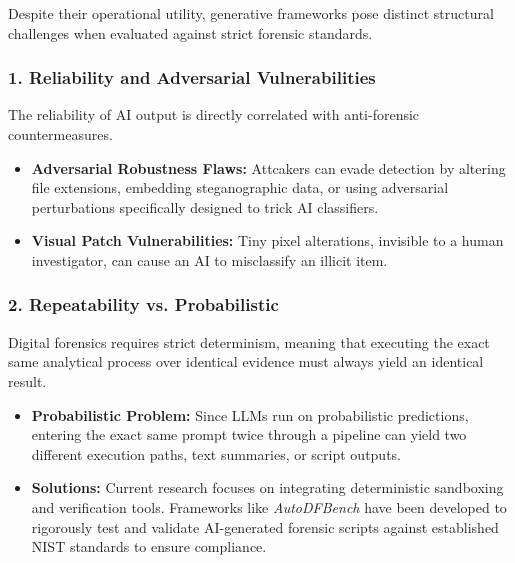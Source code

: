 Despite their operational utility, generative frameworks pose distinct structural challenges when evaluated against strict forensic standards.

\subsubsection*{1. Reliability and Adversarial Vulnerabilities}
The reliability of AI output is directly correlated with anti-forensic countermeasures.
\begin{itemize}
    \item \textbf{Adversarial Robustness Flaws:} Attcakers can evade detection by altering file extensions, embedding steganographic data, or using adversarial perturbations specifically designed to trick AI classifiers.
    \item \textbf{Visual Patch Vulnerabilities:} Tiny pixel alterations, invisible to a human investigator, can cause an AI to misclassify an illicit item.
\end{itemize}

\subsubsection*{2. Repeatability vs. Probabilistic}
Digital forensics requires strict determinism, meaning that executing the exact same analytical process over identical evidence must always yield an identical result.
\begin{itemize}
    \item \textbf{Probabilistic Problem:} Since LLMs run on probabilistic predictions, entering the exact same prompt twice through a pipeline can yield two different execution paths, text summaries, or script outputs.
    \item \textbf{Solutions:} Current research focuses on integrating deterministic sandboxing and verification tools. Frameworks like \textit{AutoDFBench} have been developed to rigorously test and validate AI-generated forensic scripts against established NIST standards to ensure compliance.
\end{itemize}

